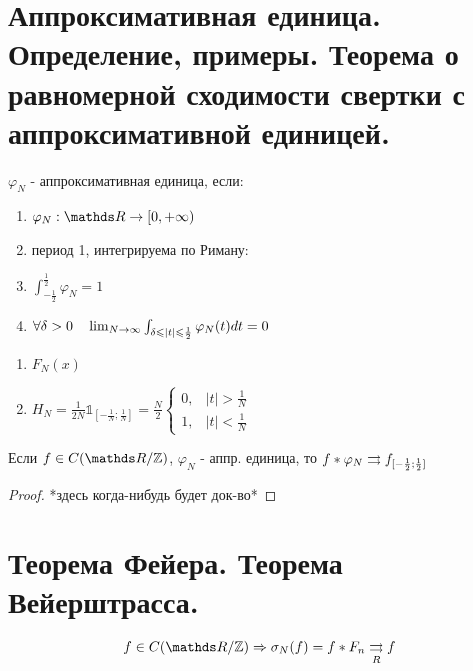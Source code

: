 \documentclass[matan]{subfiles}
\begin{document}
  \newpage
  \section{Аппроксимативная единица. Определение, примеры. Теорема о равномерной сходимости свертки с аппроксимативной единицей.}
  \begin{definition}
    $\varphi_N$ - аппроксимативная единица, если:
    \begin{enumerate}
      \item $\varphi_N: \R \ra [0, + \infty)$
      \item период 1, интегрируема по Риману:
      \item $\int_{-\frac{1}{2}}^{\frac{1}{2}} \varphi_N = 1$
      \item $\forall \delta > 0\quad \lim_{N \rightarrow \infty} \int_{\delta \leqslant |t| \leqslant \frac{1}{2}} \varphi_N(t) dt = 0$
    \end{enumerate}
  \end{definition}

  \begin{examples}
    \begin{enumerate}
      \item $F_N(x)$
      \item $H_N = \frac{1}{2N} \mathbb{1}_{[-\frac{1}{N};\frac{1}{N}]} = \frac{N}{2} \begin{cases}
        0,& |t| > \frac{1}{N}\\
        1,& |t| < \frac{1}{N}
      \end{cases}$
    \end{enumerate}
  \end{examples}

  \begin{theorem}
    Если $f \in C(\R/\Z)$, $\varphi_N$ - аппр. единица, то $f * \varphi_N \rightrightarrows f_{[-\frac{1}{2}; \frac{1}{2}]}$
  \end{theorem}

  \begin{proof}
    *здесь когда-нибудь будет док-во*
  \end{proof}


  \newpage
  \section{Теорема Фейера. Теорема Вейерштрасса.}

  \begin{Theorem}[Фейера]
      \[f \in C(\R/\Z) \Ra \sigma_N(f) = f * F_n \us{R}{\rightrightarrows} f\]
  \end{Theorem}
\end{document}
